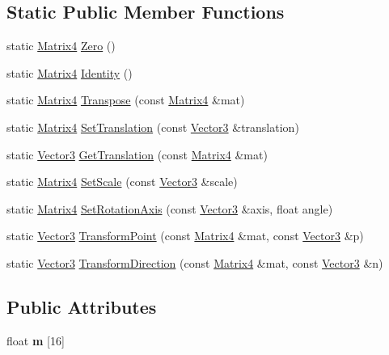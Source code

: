 \subsection*{Static Public Member Functions}
\begin{DoxyCompactItemize}
\item 
static \hyperlink{class_matrix4}{Matrix4} \hyperlink{class_matrix4_a2a4902003a3cf712cb6baf3fb87a5c97}{Zero} ()
\item 
static \hyperlink{class_matrix4}{Matrix4} \hyperlink{class_matrix4_ae114a47efddacad2207eadac5f532098}{Identity} ()
\item 
static \hyperlink{class_matrix4}{Matrix4} \hyperlink{class_matrix4_a23836c2ff14cd2ddaca541b18a75e40b}{Transpose} (const \hyperlink{class_matrix4}{Matrix4} \&mat)
\item 
static \hyperlink{class_matrix4}{Matrix4} \hyperlink{class_matrix4_a18a798425b4832c7798faa3d9efc2353}{Set\+Translation} (const \hyperlink{class_vector3}{Vector3} \&translation)
\item 
static \hyperlink{class_vector3}{Vector3} \hyperlink{class_matrix4_a89ca1ebbb17ff31088eba0717d39081f}{Get\+Translation} (const \hyperlink{class_matrix4}{Matrix4} \&mat)
\item 
static \hyperlink{class_matrix4}{Matrix4} \hyperlink{class_matrix4_a752879f3a6c5d5d941e9ae73e765e31e}{Set\+Scale} (const \hyperlink{class_vector3}{Vector3} \&scale)
\item 
static \hyperlink{class_matrix4}{Matrix4} \hyperlink{class_matrix4_abec52734ac8ee872a518d7215a4569be}{Set\+Rotation\+Axis} (const \hyperlink{class_vector3}{Vector3} \&axis, float angle)
\item 
static \hyperlink{class_vector3}{Vector3} \hyperlink{class_matrix4_a9689e66f64c12010784feed25a85a0ca}{Transform\+Point} (const \hyperlink{class_matrix4}{Matrix4} \&mat, const \hyperlink{class_vector3}{Vector3} \&p)
\item 
static \hyperlink{class_vector3}{Vector3} \hyperlink{class_matrix4_a9fe99a8a30a59bf2ff059c3e179c8571}{Transform\+Direction} (const \hyperlink{class_matrix4}{Matrix4} \&mat, const \hyperlink{class_vector3}{Vector3} \&n)
\end{DoxyCompactItemize}
\subsection*{Public Attributes}
\begin{DoxyCompactItemize}
\item 
\hypertarget{class_matrix4_a2da02f7831b9bd25b272756d7e5eb90b}{}float {\bfseries m} \mbox{[}16\mbox{]}\label{class_matrix4_a2da02f7831b9bd25b272756d7e5eb90b}

\end{DoxyCompactItemize}


